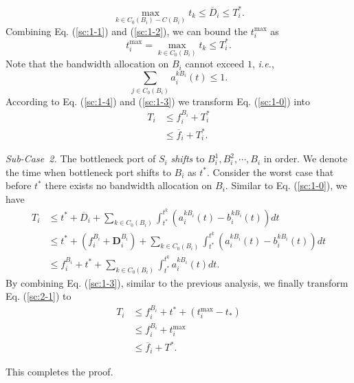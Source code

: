 \documentclass[10pt,journal,compsoc]{IEEEtran}
\begin{document}
\begin{IEEEproof}
\begin{equation}
	\max_{k \in C_0(B_i)-C(B_i)} t_k \leq \overline{D}_i \leq T_i^*.
\end{equation}
%
Combining Eq. (\ref{sc:1-1}) and (\ref{sc:1-2}), we can bound the $t_i^{\text{max}}$ as
%
\begin{equation}\label{sc:1-4}
	t_i^{\text{max}} = \max_{k \in C_0(B_i)} t_k \leq T_i^*.
\end{equation}
%
Note that the bandwidth allocation on $B_i$ cannot exceed $1$, \emph{i.e.},
%
\begin{equation}\label{sc:1-3}
	\sum_{j \in C_0(B_i)} a_i^{kB_i}(t) \leq 1.
\end{equation}
%
According to Eq. (\ref{sc:1-4}) and (\ref{sc:1-3}) we transform Eq. (\ref{sc:1-0}) into
%
\begin{equation}
	\begin{aligned}
		T_i & \leq f_i^{B_i} + T_i^*\\
		& \leq \overline{f}_i + T_i^*.
	\end{aligned}
\end{equation}

\emph{Sub-Case~2.} The bottleneck port of $S_i$ \emph{shifts} to $B_i^1,B_i^2,\cdots,B_i$ in order.
%
We denote the time when bottleneck port shifts to $B_i$ as $t^*$.
%
Consider the worst case that before $t^*$ there exists no bandwidth allocation on $B_i$.
%
Similar to Eq. (\ref{sc:1-0}), we have
%
\begin{equation}\label{sc:2-1}
	\begin{aligned}
		T_i & \leq t^* + \overline{D}_i + \sum_{k \in C_0(B_i)}\int_{t^*}^{t^k}(a_i^{kB_i}(t)-b_i^{kB_i}(t))dt\\
		& \leq t^* + (f_i^{B_i} + \mathbf{D}_i^{B_i}) + \sum_{k \in C_0(B_i)}\int_{t^*}^{t^k}(a_i^{kB_i}(t)-b_i^{kB_i}(t))dt\\
		& \leq f_i^{B_i} + t^* + \sum_{k \in C_0(B_i)}\int_{t^*}^{t^k} a_i^{kB_i}(t)dt.
	\end{aligned}
\end{equation}
%
By combining Eq. (\ref{sc:1-3}), similar to the previous analysis, we finally transform Eq. (\ref{sc:2-1}) to
%
\begin{equation}
	\begin{aligned}
		T_i & \leq f_i^{B_i} + t^* + (t_i^{\text{max}} - t_*)\\
		& \leq f_i^{B_i} + t_i^{\text{max}}\\
		& \leq \overline{f}_i + T^*.
	\end{aligned}
\end{equation}

This completes the proof.
\end{IEEEproof}
\end{document}

